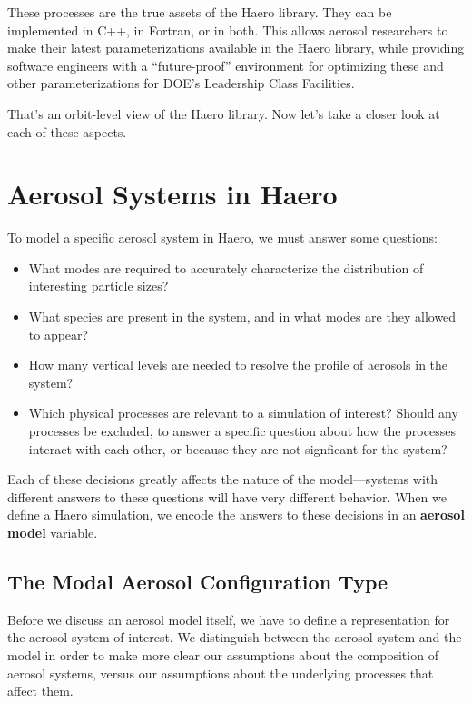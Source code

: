 These processes are the true assets of the Haero library. They can be
implemented in C++, in Fortran, or in both. This allows aerosol researchers to
make their latest parameterizations available in the Haero library, while
providing software engineers with a ``future-proof'' environment for optimizing
these and other parameterizations for DOE's Leadership Class Facilities.

That's an orbit-level view of the Haero library. Now let's take a closer look at
each of these aspects.

\section{Aerosol Systems in Haero}

To model a specific aerosol system in Haero, we must answer some questions:

\begin{itemize}
  \item What modes are required to accurately characterize the distribution of
        interesting particle sizes?
  \item What species are present in the system, and in what modes are they
        allowed to appear?
  \item How many vertical levels are needed to resolve the profile of aerosols
        in the system?
  \item Which physical processes are relevant to a simulation of interest?
        Should any processes be excluded, to answer a specific question about
        how the processes interact with each other, or because they are not
        signficant for the system?
\end{itemize}

Each of these decisions greatly affects the nature of the model---systems with
different answers to these questions will have very different behavior. When we
define a Haero simulation, we encode the answers to these decisions in an
{\bf aerosol model} variable.

\subsection{The Modal Aerosol Configuration Type}

Before we discuss an aerosol model itself, we have to define a representation
for the aerosol system of interest. We distinguish between the aerosol system
and the model in order to make more clear our assumptions about the composition
of aerosol systems, versus our assumptions about the underlying processes that
affect them.

